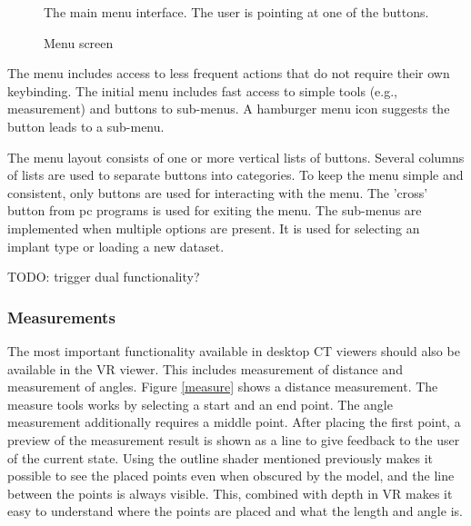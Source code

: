 \documentclass[a4paper]{report}
\begin{document}
\begin{figure}[h!]
    \centering
	\hfill
	\caption{Menu screen}\label{menu}
  \small
  The main menu interface. The user is pointing at one of the buttons.
\end{figure}

The menu includes access to less frequent actions that do not require their own keybinding. The initial menu includes fast access to simple tools (e.g., measurement) and buttons to sub-menus. A hamburger menu icon suggests the button leads to a sub-menu.

The menu layout consists of one or more vertical lists of buttons. Several columns of lists are used to separate buttons into categories. To keep the menu simple and consistent, only buttons are used for interacting with the menu. The 'cross' button from pc programs is used for exiting the menu.
The sub-menus are implemented when multiple options are present. It is used for selecting an implant type or loading a new dataset.

TODO: trigger dual functionality?

\subsubsection{Measurements}
The most important functionality available in desktop CT viewers should also be available in the VR viewer. This includes measurement of distance and measurement of angles. Figure \ref{measure} shows a distance measurement.
The measure tools works by selecting a start and an end point. The angle measurement additionally requires a middle point.
After placing the first point, a preview of the measurement result is shown as a line to give feedback to the user of the current state.
Using the outline shader mentioned previously makes it possible to see the placed points even when obscured by the model, and the line between the points is always visible. This, combined with depth in VR makes it easy to understand where the points are placed and what the length and angle is.
\end{document}
